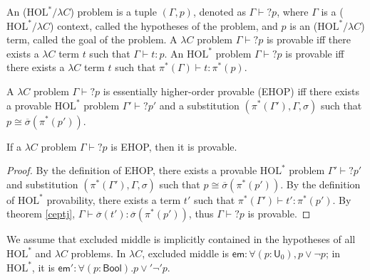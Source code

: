 \begin{definition} An ($\text{HOL}^*/\lambda C$) problem is a tuple $(\Gamma, p)$, denoted
  as $\Gamma \vdash? p$, where $\Gamma$ is a ($\text{HOL}^*/\lambda C$)
  context, called the hypotheses of the problem, and $p$ is an
  ($\text{HOL}^*/\lambda C$) term, called the goal of the problem. A $\lambda C$ problem
  $\Gamma \vdash? p$ is provable iff there exists a $\lambda C$ term $t$ such that
  $\Gamma \vdash t : p$. An $\text{HOL}^*$ problem $\Gamma \vdash? p$ is provable iff there exists
  a $\lambda C$ term $t$ such that $\pi^*(\Gamma) \vdash t : \pi^*(p)$.
\end{definition}

\begin{definition} A $\lambda C$ problem $\Gamma \vdash? p$ is essentially higher-order provable (EHOP)
  iff there exists a provable $\text{HOL}^*$ problem $\Gamma' \vdash? p'$ and a substitution
  $(\pi^*(\Gamma'), \Gamma, \sigma)$ such that $p \cong \overline{\sigma}(\pi^*(p'))$.
\end{definition}

\begin{theorem}
  If a $\lambda C$ problem $\Gamma \vdash? p$ is EHOP, then it is provable.
\end{theorem}
\begin{proof} By the definition of EHOP, there exists a provable $\text{HOL}^*$ problem
  $\Gamma' \vdash? p'$ and substitution $(\pi^*(\Gamma'), \Gamma, \sigma)$ such that
  $p \cong \overline{\sigma}(\pi^*(p'))$. By the definition of $\text{HOL}^*$ provability, there exists
  a term $t'$ such that $\pi^*(\Gamma') \vdash t' : \pi^*(p')$. By theorem \ref{ceptj},
  $\Gamma \vdash \overline{\sigma}(t') : \overline{\sigma}(\pi^*(p'))$, thus $\Gamma \vdash? p$
  is provable.
\end{proof}

We assume that excluded middle is implicitly contained in the hypotheses of all
$\text{HOL}^*$ and $\lambda C$ problems. In $\lambda C$, excluded middle is
$\mathsf{em} : \forall (p : \mathsf{U}_0), p \lor \neg p$; in $\text{HOL}^*$, it is
$\mathsf{em}' : \forall (p : \mathsf{Bool}). p \lor' \neg' p$.

